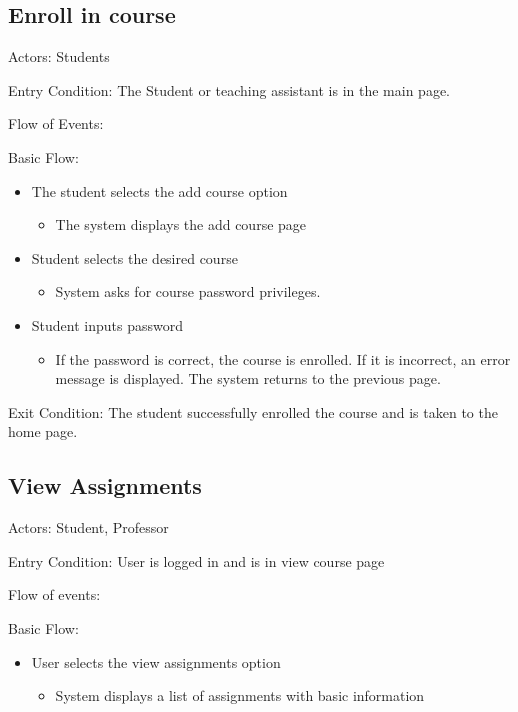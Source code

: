 \subsection*{Enroll in course}\label{section:h.rjvrpx5d6ohf}
Actors: Students

Entry Condition: The Student or teaching assistant is in the main page. 

Flow of Events:

Basic Flow:

\begin{itemize}
\item The student selects the add course option
\begin{itemize}
\item The system displays the add course page
\end{itemize}
\item Student selects the desired course
\begin{itemize}
\item System asks for course password
privileges.
\end{itemize}
\item Student inputs password
\begin{itemize}
\item If the password is correct, the course is enrolled. If it is incorrect, an error message is displayed. The system returns to the previous page.
\end{itemize}
\end{itemize}
Exit Condition: The student successfully enrolled the course and is 
taken to the home page.

\subsection*{View Assignments}\label{section:h.7pxq6fih8yfa}
Actors: Student, Professor

Entry Condition: User is logged in and is in view course page

Flow of events: 

Basic Flow:

\begin{itemize}
\item User selects the view assignments option
\begin{itemize}
\item System displays a list of assignments with basic information
\end{itemize}
\end{itemize}

